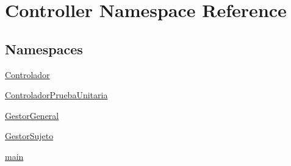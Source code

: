 \hypertarget{namespace_controller}{}\section{Controller Namespace Reference}
\label{namespace_controller}
\subsection*{Namespaces}
\begin{DoxyCompactItemize}
\item 
 \hyperlink{namespace_controller_1_1_controlador}{Controlador}
\item 
 \hyperlink{namespace_controller_1_1_controlador_prueba_unitaria}{Controlador\+Prueba\+Unitaria}
\item 
 \hyperlink{namespace_controller_1_1_gestor_general}{Gestor\+General}
\item 
 \hyperlink{namespace_controller_1_1_gestor_sujeto}{Gestor\+Sujeto}
\item 
 \hyperlink{namespace_controller_1_1main}{main}
\end{DoxyCompactItemize}

